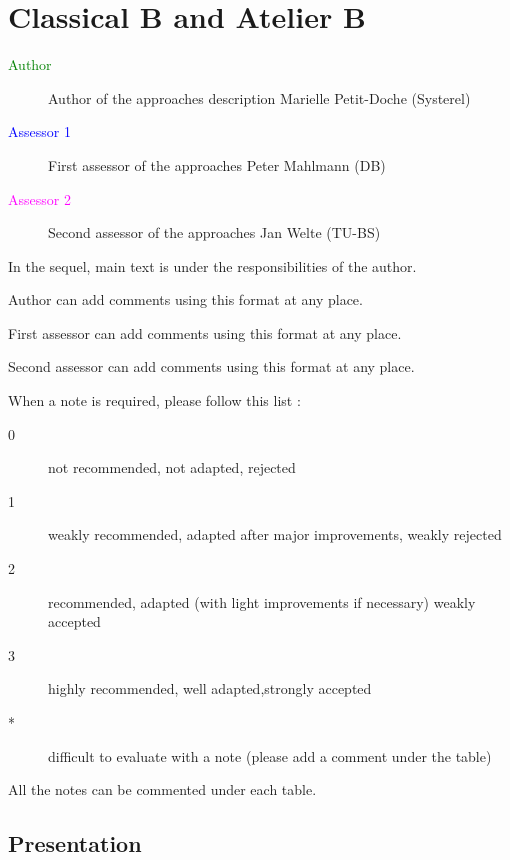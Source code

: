 \chapter{Classical B and Atelier B}


\begin{description}
\item[\textcolor{green}{Author}] Author of the approaches description  Marielle Petit-Doche (Systerel)
\item[\textcolor{blue}{Assessor 1}] First assessor of the approaches Peter Mahlmann (DB)
\item[\textcolor{magenta}{Assessor 2}] Second assessor of the approaches Jan Welte (TU-BS)
\end{description}

In the sequel, main text is under the responsibilities of the author.

\begin{author_comment}
Author can add comments using this format at any place.
\end{author_comment}

\begin{assessor1}
First assessor can add comments using this format at any place.
\end{assessor1}

\begin{assessor2}
Second assessor can add comments using this format at any place.
\end{assessor2}

When a note is required, please follow this list :
\begin{description}
\item[0] not recommended, not adapted, rejected
\item[1] weakly recommended, adapted after major improvements, weakly rejected
\item[2] recommended, adapted (with light improvements if necessary)  weakly accepted
\item[3] highly recommended, well adapted,strongly accepted
\item[*] difficult to evaluate with a note (please add a comment under the table)
\end{description}

All the notes can be commented under each table.

\section{Presentation}

